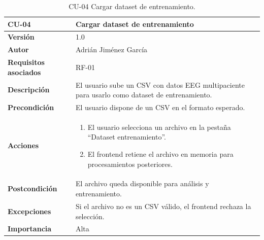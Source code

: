 \begin{table}[p]
	\centering
	\begin{tabularx}{\linewidth}{ p{} X }
		\toprule
		\textbf{CU-04}    & \textbf{Cargar dataset de entrenamiento}\\
		\toprule
		\textbf{Versión}              & 1.0 \\
		\textbf{Autor}                & Adrián Jiménez García \\
		\textbf{Requisitos asociados} & RF-01 \\
		\textbf{Descripción}          & El usuario sube un CSV con datos EEG multipaciente para usarlo como dataset de entrenamiento. \\
		\textbf{Precondición}         & El usuario dispone de un CSV en el formato esperado. \\
		\textbf{Acciones}             &
		\begin{enumerate}
			\def\labelenumi{\arabic{enumi}.}
			\tightlist
			\item El usuario selecciona un archivo en la pestaña ``Dataset entrenamiento''.
			\item El frontend retiene el archivo en memoria para procesamientos posteriores.
		\end{enumerate}\\
		\textbf{Postcondición}        & El archivo queda disponible para análisis y entrenamiento. \\
		\textbf{Excepciones}          & Si el archivo no es un CSV válido, el frontend rechaza la selección. \\
		\textbf{Importancia}          & Alta \\
		\bottomrule
	\end{tabularx}
	\caption{CU-04 Cargar dataset de entrenamiento.}
\end{table}

